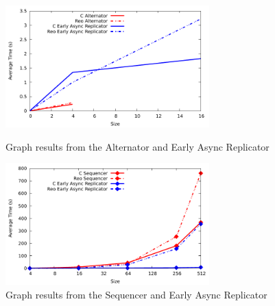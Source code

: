 \begin{figure}[h]
    \begin{center}
        \includegraphics[width=0.7\textwidth]{img/alt-eao.pdf}\\
        \caption{Graph results from the Alternator and Early Async Replicator}
        \label{grf:res}
    \end{center}
\end{figure}
\begin{figure}[h]
    \begin{center}
    \includegraphics[width=0.7\textwidth]{img/out-seq.pdf}
    \caption{Graph results from the Sequencer and Early Async Replicator}
    \label{grf:res2}
    \end{center}
\end{figure}

